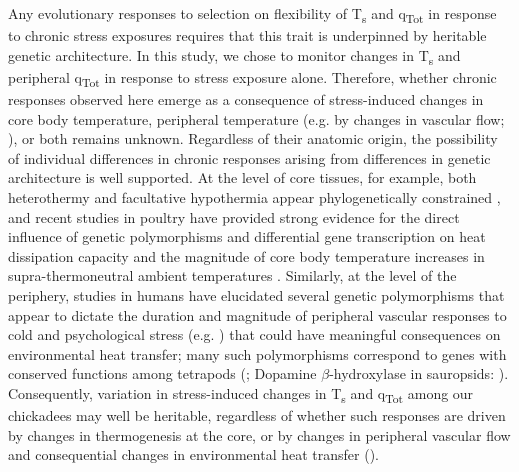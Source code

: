 \documentclass[12pt]{article}
\begin{document}
\noindent Any evolutionary responses to selection on flexibility of T\textsubscript{s} and q\textsubscript{Tot} in response to chronic stress exposures requires that this trait is underpinned by heritable genetic architecture. In this study, we chose to monitor changes in T\textsubscript{s} and peripheral q\textsubscript{Tot} in response to stress exposure alone. Therefore, whether chronic responses observed here emerge as a consequence of stress-induced changes in core body temperature, peripheral temperature (e.g. by changes in vascular flow; \citealt{oka_2001}), or both remains unknown. Regardless of their anatomic origin, the possibility of individual differences in chronic responses arising from differences in genetic architecture is well supported. At the level of core tissues, for example, both heterothermy and facultative hypothermia appear phylogenetically constrained \citep{boyles_2013,gerson_2019}, and recent studies in poultry have provided strong evidence for the direct influence of genetic polymorphisms and differential gene transcription on heat dissipation capacity and the magnitude of core body temperature increases in supra-thermoneutral ambient temperatures \citep{srikanth_2019,zhuang_2019}. Similarly, at the level of the periphery, studies in humans have elucidated several genetic polymorphisms that appear to dictate the duration and magnitude of peripheral vascular responses to cold and psychological stress (e.g. \citealt{rao_2008,chen_2010,kelsey_2010,kelsey_2012,huang_2012}) that could have meaningful consequences on environmental heat transfer; many such polymorphisms correspond to genes with conserved functions among tetrapods (\citealt{vincent_1998,yamamoto_2011,cespedes_2017}; Dopamine $\beta$-hydroxylase in sauropsids: \citealt{lovell_2015}). Consequently, variation in stress-induced changes in T\textsubscript{s} and q\textsubscript{Tot} among our chickadees may well be heritable, regardless of whether such responses are driven by changes in thermogenesis at the core, or by changes in peripheral vascular flow and consequential changes in environmental heat transfer (\citealt{robertson_2020a}). \vspace{1cm}
\end{document}
